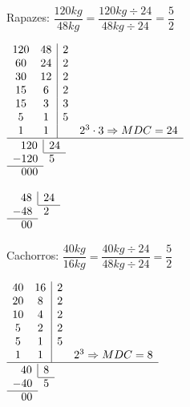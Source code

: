 \begin{enumerate}
Rapazes: $ \dfrac{120kg}{48kg} = \dfrac{120kg \div 24}{48kg \div 24} = \dfrac{5}{2} $\\

\pagebreak

\begin{multicols}{3}
	$\begin{array}{cc|cc}
120 & 48 & 2 & \\ 
60 & 24 & 2 & \\ 
30 & 12 & 2 & \\
15 & 6 & 2 & \\
15 & 3 & 3 & \\
5 & 1 & 5 & \\
1 & 1 &  & 2^3 \cdot 3 \Rightarrow MDC = 24 \\
\hline 
\end{array}$\\
\columnbreak
$
\begin{array}{l l r r}
\multicolumn{2}{r}{120} \vline & \multicolumn{2}{l}{24} \\ \cline{3-4}
\multicolumn{2}{l}{-120} & \multicolumn{2}{l}{5} \\ \cline{1-2}
\multicolumn{2}{r}{000} &  \\
\end{array}
$

\columnbreak
$
\begin{array}{l l r r}
\multicolumn{2}{r}{48} \vline & \multicolumn{2}{l}{24} \\ \cline{3-4}
\multicolumn{2}{l}{-48} & \multicolumn{2}{l}{2} \\ \cline{1-2}
\multicolumn{2}{r}{00} &  \\
\end{array}
$
\end{multicols}

Cachorros: $ \dfrac{40kg}{16kg} = \dfrac{40kg \div 24}{48kg \div 24} = \dfrac{5}{2} $\\

\begin{multicols}{3}
	$\begin{array}{cc|cc}
	40 & 16 & 2 & \\ 
	20 & 8 & 2 & \\ 
	10 & 4 & 2 & \\
	5 & 2 & 2 & \\
	5 & 1 & 5 & \\
	1 & 1 &  & 2^3 \Rightarrow MDC = 8 \\
	\hline 
	\end{array}$\\
	\columnbreak
	$
	\begin{array}{l l r r}
	\multicolumn{2}{r}{40} \vline & \multicolumn{2}{l}{8} \\ \cline{3-4}
	\multicolumn{2}{l}{-40} & \multicolumn{2}{l}{5} \\ \cline{1-2}
	\multicolumn{2}{r}{00} &  \\
	\end{array}
	$
	

\end{multicols}
\end{enumerate}
